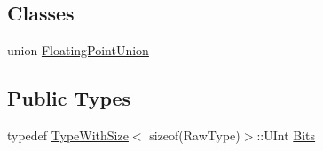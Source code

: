 \subsection*{Classes}
\begin{DoxyCompactItemize}
\item 
union \hyperlink{uniontesting_1_1internal_1_1FloatingPoint_1_1FloatingPointUnion}{Floating\+Point\+Union}
\end{DoxyCompactItemize}
\subsection*{Public Types}
\begin{DoxyCompactItemize}
\item 
typedef \hyperlink{classtesting_1_1internal_1_1TypeWithSize}{Type\+With\+Size}$<$ sizeof(Raw\+Type)$>$\+::U\+Int \hyperlink{classtesting_1_1internal_1_1FloatingPoint_abf228bf6cd48f12c8b44c85b4971a731}{Bits}
\end{DoxyCompactItemize}
